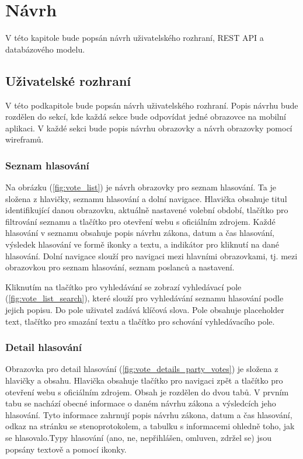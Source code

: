 \chapter{Návrh}
\setcounter{page}{1}

V této kapitole bude popsán návrh uživatelského rozhraní, REST API a databázového modelu.

\section{Uživatelské rozhraní}
V této podkapitole bude popsán návrh uživatelského rozhraní. Popis návrhu bude rozdělen do sekcí, kde každá sekce bude odpovídat jedné obrazovce na mobilní aplikaci. V každé sekci bude popis návrhu obrazovky a návrh obrazovky pomocí wireframů.

\subsection*{Seznam hlasování}
\label{ssec:design-votes}

Na obrázku (\ref{fig:vote_list}) je návrh obrazovky pro seznam hlasování. Ta je složena z hlavičky, seznamu hlasování a dolní navigace. Hlavička obsahuje titul identifikující danou obrazovku,  aktuálně nastavené volební období, tlačítko pro filtrování seznamu a tlačítko pro otevření webu s oficiálním zdrojem. Každé hlasování v seznamu obsahuje popis návrhu zákona, datum a čas hlasování, výsledek hlasování ve formě ikonky a textu, a indikátor pro kliknutí na dané hlasování. Dolní navigace slouží pro navigaci mezi hlavními obrazovkami, tj. mezi obrazovkou pro seznam hlasování, seznam poslanců a nastavení.

Kliknutím na tlačítko pro vyhledávání se zobrazí vyhledávací pole (\ref{fig:vote_list_search}), které slouží pro vyhledávání seznamu hlasování podle jejich popisu. Do pole uživatel zadává klíčová slova. Pole obsahuje placeholder text, tlačítko pro smazání textu a tlačítko pro schování vyhledávacího pole.%

\subsection*{Detail hlasování}
\label{ssec:design-vote}

Obrazovka pro detail hlasování (\ref{fig:vote_details_party_votes}) je složena z hlavičky a obsahu. Hlavička obsahuje tlačítko pro navigaci zpět a tlačítko pro otevření webu s oficiálním zdrojem. Obsah je rozdělen do dvou tabů. V prvním tabu se nachází obecné informace o daném návrhu zákona a výsledcích jeho hlasování. Tyto informace zahrnují popis návrhu zákona, datum a čas hlasování, odkaz na stránku se stenoprotokolem, a tabulku s informacemi ohledně toho, jak se hlasovalo.Typy hlasování (ano, ne, nepřihlášen, omluven, zdržel se) jsou popsány textově a pomocí ikonky.

